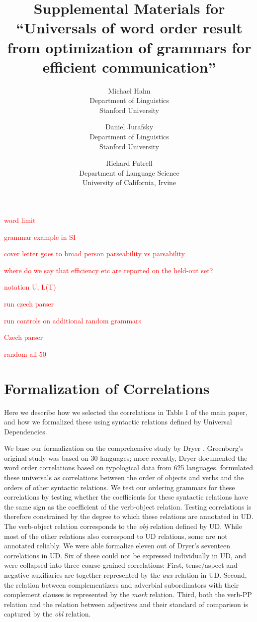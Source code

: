 \documentclass[10pt,twoside,lineno]{article}
\title{Supplemental Materials for ``Universals of word order result from optimization of grammars for efficient communication''}
\author{
        Michael Hahn \\
                Department of Linguistics\\
       Stanford University
            \and
       Daniel Jurafsky\\
       Department of Linguistics\\
       Stanford University \\
       \and
       Richard Futrell\\
       Department of Language Science\\
       University of California, Irvine
}
\begin{document}
\maketitle




\tableofcontents


\textcolor{red}{word limit}

\textcolor{red}{grammar example in SI}

\textcolor{red}{cover letter goes to broad person}
\textcolor{red}{parseability vs parsability}

\textcolor{red}{where do we say that efficiency etc are reported on the held-out set?}

\textcolor{red}{notation U, L(T)}

\textcolor{red}{run czech parser}

\textcolor{red}{run controls on additional random grammars}

\textcolor{red}{Czech parser}

\textcolor{red}{random all 50}

\section{Formalization of Correlations}\label{sec:correlations}


Here we describe how we selected the correlations in Table 1 of the main paper, and how we formalized these using syntactic relations defined by Universal Dependencies.

We base our formalization on the comprehensive study by Dryer \cite{dryer1992greenbergian}.
Greenberg's original study was based on 30 languages; more recently, Dryer \cite{dryer1992greenbergian} documented the word order correlations based on typological data from 625 languages.
\cite{dryer1992greenbergian} formulated these universals as correlations between the order of objects and verbs and the orders of other syntactic relations.
We test our ordering grammars for these correlations by testing whether the coefficients for these syntactic relations have the same sign as the coefficient of the verb-object relation.
Testing correlations is therefore constrained by the degree to which these relations are annotated in UD.
The verb-object relation corresponds to the  \emph{obj} relation defined by UD.
While most of the other relations also correspond to UD relations, some are not annotated reliably.
We were able formalize eleven out of Dryer's seventeen correlations in UD.
Six of these could not be expressed individually in UD, and were collapsed into three coarse-grained correlations:
First, tense/aspect and negative auxiliaries are together represented by the \emph{aux} relation in UD.
Second, the relation between complementizers and adverbial subordinators with their complement clauses is represented by the \emph{mark} relation.
Third, both the verb-PP relation and the relation between adjectives and their standard of comparison is captured by the \emph{obl} relation.
\end{document}
